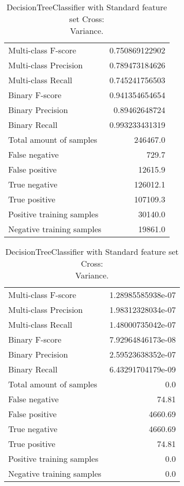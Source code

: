 \begin{table}[H]
\begin{minipage}{0.5\textwidth}
\caption{DecisionTreeClassifier with Standard feature set Cross: \\Average.}
\centering
\begin{tabular}{l r}
\toprule
Multi-class F-score & 0.750869122902 \\
Multi-class Precision & 0.789473184626 \\
Multi-class Recall & 0.745241756503 \\
\midrule
Binary F-score & 0.941354654654 \\
Binary Precision & 0.89462648724 \\
Binary Recall & 0.993233431319 \\
\midrule
Total amount of samples & 246467.0 \\
False negative & 729.7 \\
False positive & 12615.9 \\
True negative & 126012.1 \\
True positive & 107109.3 \\
\midrule
Positive training samples & 30140.0 \\
Negative training samples & 19861.0 \\
\bottomrule
\end{tabular}
\end{minipage}
\hfillx
\begin{minipage}{0.5\textwidth}
\caption{DecisionTreeClassifier with Standard feature set Cross: \\Variance.}
\centering
\begin{tabular}{l r}
\toprule
Multi-class F-score & 1.28985585938e-07 \\
Multi-class Precision & 1.98312328034e-07 \\
Multi-class Recall & 1.48000735042e-07 \\
\midrule
Binary F-score & 7.92964846173e-08 \\
Binary Precision & 2.59523638352e-07 \\
Binary Recall & 6.43291704179e-09 \\
\midrule
Total amount of samples & 0.0 \\
False negative & 74.81 \\
False positive & 4660.69 \\
True negative & 4660.69 \\
True positive & 74.81 \\
\midrule
Positive training samples & 0.0 \\
Negative training samples & 0.0 \\
\bottomrule
\end{tabular}
\end{minipage}
\end{table}

